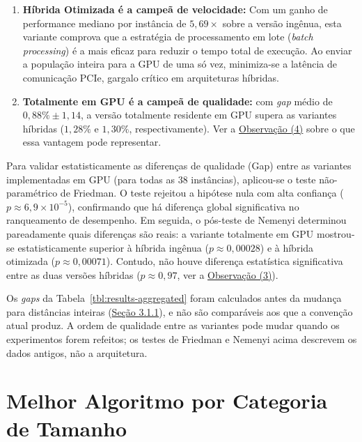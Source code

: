 \begin{enumerate}
  \def\labelenumi{\arabic{enumi}.}
  \tightlist
  \item
        \textbf{Híbrida Otimizada é a campeã de velocidade:} Com um ganho de performance mediano por instância de \(5{,}69\times\) sobre a versão ingênua, esta variante comprova que a estratégia de processamento em lote (\emph{batch processing}) é a mais eficaz para reduzir o tempo total de execução.
        Ao enviar a população inteira para a GPU de uma só vez, minimiza-se a latência de comunicação PCIe, gargalo crítico em arquiteturas híbridas.
  \item
        \textbf{Totalmente em GPU é a campeã de qualidade:} com \emph{gap} médio de \(0{,}88\% \pm 1{,}14\), a versão totalmente residente em GPU supera as variantes híbridas (\(1{,}28\%\) e \(1{,}30\%\), respectivamente).
        Ver a \hyperref[obs-erro-iteracoes]{Observação (4)} sobre o que essa vantagem pode representar.
\end{enumerate}

Para validar estatisticamente as diferenças de qualidade (Gap) entre as variantes implementadas em GPU (para todas as 38 instâncias), aplicou-se o teste não-paramétrico de Friedman.
O teste rejeitou a hipótese nula com alta confiança (\(p \approx 6{,}9 \times 10^{-5}\)), confirmando que há diferença global significativa no ranqueamento de desempenho.
Em seguida, o pós-teste de Nemenyi determinou pareadamente quais diferenças são reais: a variante totalmente em GPU mostrou-se estatisticamente superior à híbrida ingênua (\(p \approx 0{,}00028\)) e à híbrida otimizada (\(p \approx 0{,}00071\)).
Contudo, não houve diferença estatística significativa entre as duas versões híbridas (\(p \approx 0{,}97\), ver a \hyperref[obs-aritmetica]{Observação (3)}).

\begin{warning}\label{obs-aritmetica}
  Os \emph{gaps} da Tabela~\ref{tbl:results-aggregated} foram calculados antes da mudança para distâncias inteiras (\hyperref[sec-311-hardware-software]{Seção 3.1.1}), e não são comparáveis aos que a convenção atual produz.
  A ordem de qualidade entre as variantes pode mudar quando os experimentos forem refeitos; os testes de Friedman e Nemenyi acima descrevem os dados antigos, não a arquitetura.
\end{warning}

\section{Melhor Algoritmo por Categoria de Tamanho}\label{sec-44-melhor-algoritmo}

